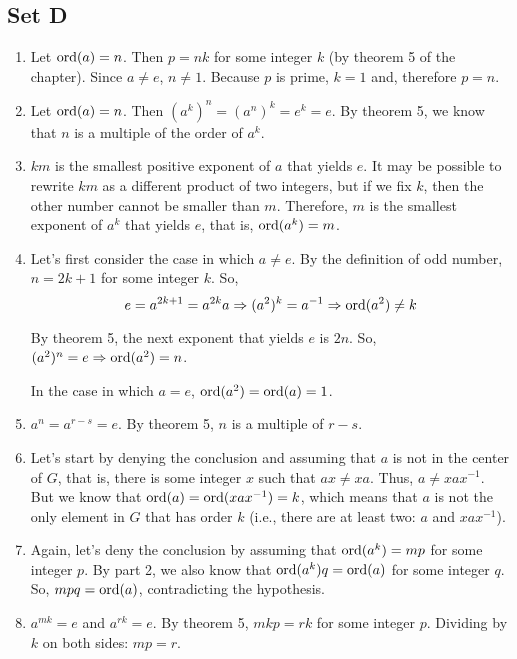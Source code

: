 \subsection{Set D}
\begin{enumerate}
    \item Let $ \operatorname{ord}(a) = n $. Then $ p = nk $ for some integer $ k $ (by theorem 5 of the chapter). Since $ a \ne e $, $ n \ne  1$. Because $ p $ is prime, $  k = 1 $ and, therefore $ p = n $.

    \item Let $ \operatorname{ord}(a) = n $. Then $ (a^k)^n = (a^n)^k = e^k = e $. By theorem 5, we know that $ n $ is a multiple of the order of $ a^k $.

    \item $ km $ is the smallest positive exponent of $ a $ that yields $ e $. It may be possible to rewrite $ km $ as a different product of two integers, but if we fix $ k $, then the other number cannot be smaller than $ m $. Therefore, $ m $ is the smallest exponent of $ a^k $ that yields $ e $, that is, $ \operatorname{ord}(a^k) = m $.

    \item Let's first consider the case in which $ a \ne e $. By the definition of odd number, $ n = 2k + 1 $ for some integer $ k $. So, 
    $$ e = a^{2k + 1} = a^{2k}a \Rightarrow (a^2)^k = a^{-1} \Rightarrow \operatorname{ord}(a^2) \ne k $$

    By theorem 5, the next exponent that yields $e$ is $ 2n $. So, $ (a^{2})^n = e \Rightarrow \operatorname{ord}(a^2) = n $.

    In the case in which $ a = e $, $ \operatorname{ord}(a^2) = \operatorname{ord}(a) = 1 $.

    \item $ a^n = a^{r - s} = e $. By theorem 5, $ n $ is a multiple of $ r - s $.

    \item Let's start by denying the conclusion and assuming that $ a $ is not in the center of $ G $, that is, there is some integer $ x $ such that $ ax \ne xa $. Thus, $ a \ne xax^{-1} $. But we know that $ \operatorname{ord}(a) = \operatorname{ord}(xax^{-1}) = k $, which means that $ a $ is not the only element in $ G $ that has order $ k $ (i.e., there are at least two: $ a $ and $ xax^{-1} $).

    \item Again, let's deny the conclusion by assuming that $ \operatorname{ord}(a^k) = mp $ for some integer $ p $. By part 2, we also know that $ \operatorname{ord}(a^k)q = \operatorname{ord}(a) $ for some integer $ q $. So, $ mpq = \operatorname{ord}(a) $, contradicting the hypothesis.

    \item $ a^{mk} = e $ and $ a^{rk} = e $. By theorem 5, $ mkp = rk $ for some integer $ p $. Dividing by $ k $ on both sides: $ mp = r $. 
\end{enumerate}

